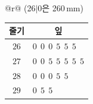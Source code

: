 {\renewcommand{\arraystretch}{1.25}\small
\begin{tabular}{@{}r@{}}
{\footnotesize (26$|$0은 260\,mm)} \\[1pt]
\begin{tabular}{c|@{\ \ }l}
\hline
줄기 & \multicolumn{1}{c}{잎} \\ \hline
$26$ & $0\ \ 0\ \ 0\ \ 5\ \ 5\ \ 5$ \\
$27$ & $0\ \ 0\ \ 5\ \ 5\ \ 5\ \ 5\ \ 5$ \\
$28$ & $0\ \ 0\ \ 0\ \ 5\ \ 5$ \\
$29$ & $0\ \ 5\ \ 5$ \\ \hline
\end{tabular}
\end{tabular}}
